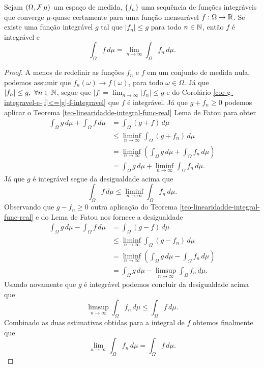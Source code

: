 \begin{teorema}
\label{Teo-Convergencia-Dominada}
Sejam $(\Omega,\mathcal{F}\,\mu)$ um espaço de medida,
$\{f_n\}$ uma sequência de funções integráveis 
que converge $\mu$-quase certamente para uma função
mensurável $f:\Omega\to\mathbb{R}$. Se existe uma função 
integrável $g$ tal que $|f_n|\leq g$ para todo
$n\in\mathbb{N}$, então $f$ é integrável e 
	\[
		\int_{\Omega} f\, d\mu 
		=
		\lim_{n\to\infty} \int_{\Omega} f_n\, d\mu.
	\]
\end{teorema}



\begin{proof}
A menos de redefinir as funções $f_n$ e $f$ em 
um conjunto de medida nula, podemos assumir que 
$f_n(\omega)\to f(\omega)$, para todo $\omega\in\Omega$.
Já que $|f_n|\leq g,\ \forall n\in\mathbb{N}$, segue que 
$|f|=\lim_{n\to\infty}|f_n|\leq g$ e do Corolário 
\ref{cor-g-integravel-e-|f|<=|g|-f-integravel}
que $f$ é integrável. Já que $g+f_n\geq 0$
podemos aplicar o 
Teorema \ref{teo-linearidadde-integral-func-real}
Lema de Fatou para obter
\begin{align*}
	\int_{\Omega} g\, d\mu + \int_{\Omega} f\, d\mu 
	&=
	\int_{\Omega} (g+f)\, d\mu 
	\\
	&\leq 
	\liminf_{n\to\infty}\int_{\Omega} (g+f_n)\, d\mu 
	\\
	&=
	\liminf_{n\to\infty}
	\left( 
		\int_{\Omega} g\, d\mu 
		+
		\int_{\Omega} f_n\, d\mu 
	\right)
	\\
	&=
	\int_{\Omega} g\, d\mu 
	+
	\liminf_{n\to\infty}\int_{\Omega} f_n\, d\mu.
\end{align*}
Já que $g$ é integrável segue da desigualdade 
acima que 	
	\[
	\int_{\Omega} f\, d\mu
	\leq	
	\liminf_{n\to\infty}\int_{\Omega} f_n\, d\mu.
	\]
Observando que $g-f_n\geq 0$ outra aplicação do 
Teorema \ref{teo-linearidadde-integral-func-real} 
e do Lema de Fatou nos fornece a desigualdade
\begin{align*}
	\int_{\Omega} g\, d\mu - \int_{\Omega} f\, d\mu 
	&=
	\int_{\Omega} (g-f)\, d\mu 
	\\
	&\leq 
	\liminf_{n\to\infty}\int_{\Omega} (g-f_n)\, d\mu 
	\\
	&=
	\liminf_{n\to\infty}
	\left( 
		\int_{\Omega} g\, d\mu 
		-
		\int_{\Omega} f_n\, d\mu 
	\right)
	\\
	&=
	\int_{\Omega} g\, d\mu 
	-
	\limsup_{n\to\infty}\int_{\Omega} f_n\, d\mu.
\end{align*}
Usando novamente que $g$ é integrável podemos 
concluir da desigualdade acima que 
	\[
	\limsup_{n\to\infty}\int_{\Omega} f_n\, d\mu
	\leq	
	\int_{\Omega} f\, d\mu.
	\]
Combinado as duas estimativas obtidas para a
integral de $f$ obtemos finalmente que 
	\[
	\lim_{n\to\infty}\int_{\Omega} f_n\, d\mu
	=	
	\int_{\Omega} f\, d\mu.
	\]
\end{proof}
